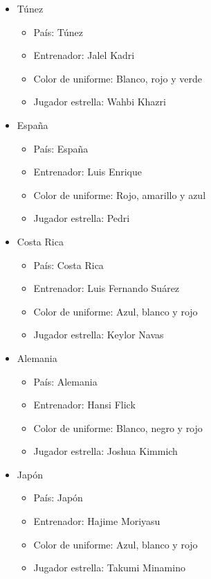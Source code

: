\begin{itemize}
\begin{itemize}
        \end{itemize}
        \item Túnez
        \begin{itemize}
            \item País: Túnez
            \item Entrenador: Jalel Kadri
            \item Color de uniforme: Blanco, rojo y verde
            \item Jugador estrella: Wahbi Khazri
        \end{itemize}
    \item España
        \begin{itemize}
            \item País: España
            \item Entrenador: Luis Enrique
            \item Color de uniforme: Rojo, amarillo y azul
            \item Jugador estrella: Pedri
        \end{itemize}
    \item Costa Rica
        \begin{itemize}
            \item País: Costa Rica
            \item Entrenador: Luis Fernando Suárez
            \item Color de uniforme: Azul, blanco y rojo
            \item Jugador estrella: Keylor Navas
        \end{itemize}
    \item Alemania
        \begin{itemize}
            \item País: Alemania
            \item Entrenador: Hansi Flick
            \item Color de uniforme: Blanco, negro y rojo
            \item Jugador estrella: Joshua Kimmich
        \end{itemize}
    \item Japón
        \begin{itemize}
            \item País: Japón
            \item Entrenador: Hajime Moriyasu
            \item Color de uniforme: Azul, blanco y rojo
            \item Jugador estrella: Takumi Minamino

\end{itemize}
\end{itemize}
